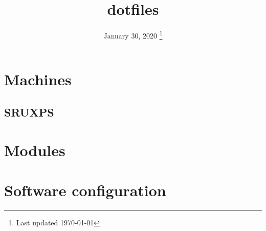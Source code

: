 \documentclass[a4paper,titlepage,xelatex]{tufte-book}
\title{dotfiles}
\date{%
  January 30, 2020
  \thanks{Last updated \today}
}
\begin{document}
\frontmatter
\maketitle
\tableofcontents
\mainmatter

\newpage

\chapter{Machines}
\section{SRUXPS}



\chapter{Modules}






\chapter{Software configuration}





















\backmatter



\printglossaries

\nocite{*}



\newpage
\listoftodos[To-Do]
\end{document}
